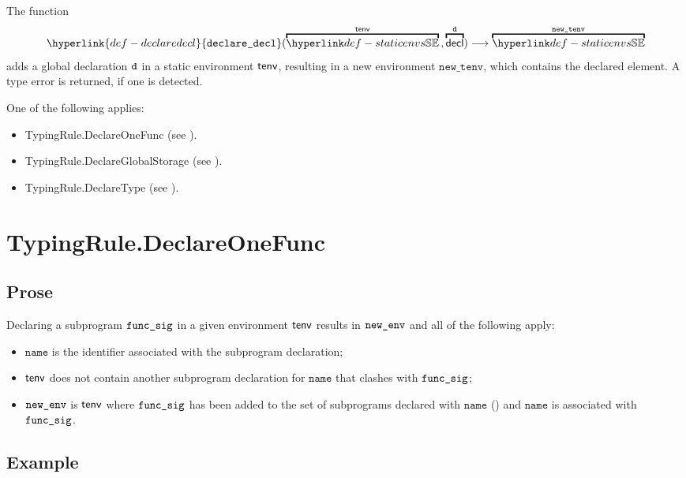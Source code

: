 \documentclass{book}
\newcommand\declaredecl[1]{\hyperlink{def-declaredecl}{\texttt{declare\_decl}}(#1)}
\newcommand\newtenv[0]{\texttt{new\_tenv}}
\newcommand\name[0]{\texttt{name}}
\begin{document}
The function
\[
  \declaredecl{\overname{\staticenvs}{\tenv} \aslsep \overname{\decl}{\vd}}
  \aslto \overname{\staticenvs}{\newtenv}
\]
adds a global declaration $\texttt{d}$ in a static environment $\textsf{tenv}$,
resulting in a new environment $\newtenv$, which contains the declared element.
A type error is returned, if one is detected.

One of the following applies:
\begin{itemize}
  \item TypingRule.DeclareOneFunc (see ).
  \item TypingRule.DeclareGlobalStorage (see ).
  \item TypingRule.DeclareType (see ).
\end{itemize}

\section{TypingRule.DeclareOneFunc \label{sec:TypingRule.DeclareOneFunc}}
\subsection{Prose}
Declaring a subprogram $\texttt{func\_sig}$ in a given environment $\textsf{tenv}$ results
in $\texttt{new\_env}$ and all of the following apply:
\begin{itemize}
  \item $\name$ is the identifier associated with the subprogram declaration;
  \item $\textsf{tenv}$ does not contain another subprogram declaration for $\name$ that clashes with $\texttt{func\_sig}$;
  \item $\texttt{new\_env}$ is $\textsf{tenv}$ where
  $\texttt{func\_sig}$ has been added to the set of subprograms declared with $\name$ (\subprogramrenamings)
  and $\name$ is associated with $\texttt{func\_sig}$.
\end{itemize}

\subsection{Example}
\end{document}
